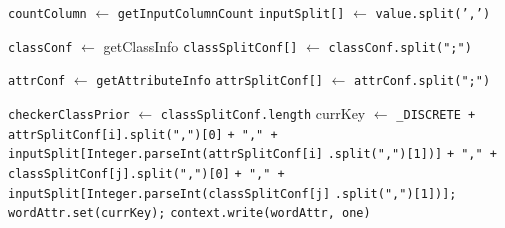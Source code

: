 \begin{enumerate}
\begin{algorithm}[H]
\begin{algorithmic}[1]
\State \texttt{countColumn} $\gets$ \texttt{getInputColumnCount}
\State \texttt{inputSplit[]} $\gets$ \texttt{value.split(',')}
	\State \Return
\EndIf

\State \texttt{classConf} $\gets$ getClassInfo 
\State \texttt{classSplitConf[]} $\gets$ \texttt{classConf.split(";")}

\State \texttt{attrConf} $\gets$ \texttt{getAttributeInfo} 
\State \texttt{attrSplitConf[]} $\gets$ \texttt{attrConf.split(";")}

\State \texttt{checkerClassPrior} $\gets$ \texttt{classSplitConf.length}
{}	
			\State currKey $ \gets $ \verb|_|\texttt{DISCRETE + attrSplitConf[i].split(",")[0]}
              \texttt{+ "," + inputSplit[Integer.parseInt(attrSplitConf[i]}
              \texttt{.split(",")[1])]}
              \texttt{+ "," + classSplitConf[j].split(",")[0]}
              \texttt{+ "," + inputSplit[Integer.parseInt(classSplitConf[j]}
              \texttt{.split(",")[1])];}
          	\State \texttt{wordAttr.set(currKey);}
          	\State \texttt{context.write(wordAttr, one)}
		\EndFor
	\EndIf
\EndFor

\EndProcedure
\end{algorithmic}
\end{algorithm}
	

\end{enumerate}
